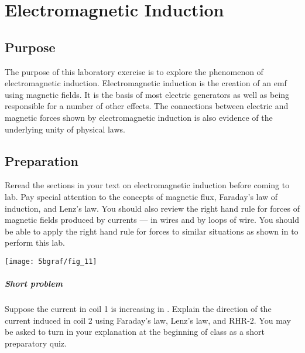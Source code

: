 \chapter{Electromagnetic Induction}

\begin{multicols}{2}
\section{Purpose}
The purpose of this laboratory exercise is to explore the phenomenon of electromagnetic induction.  Electromagnetic induction is the creation of an emf using magnetic fields.  It is the basis of most electric generators as well as being responsible for a number of other effects.  The connections between electric and magnetic forces shown by electromagnetic induction is also evidence of the underlying unity of physical laws.

\section{Preparation}
Reread the sections in your text on electromagnetic induction before coming to lab. Pay special attention to the concepts of magnetic flux, Faraday's law of induction, and Lenz's law.  You should also review the \textsf{right hand rule for forces} of magnetic fields produced by currents --- in wires and by loops of wire.  You should be able to apply the \textsf{right hand rule for forces} to similar situations as shown in  to perform this lab.



\begin{center}
	\texttt{[image: 5bgraf/fig\_11]}
	\label{f:fig11}
\end{center}

\paragraph{Short problem}
Suppose the current in coil 1 is increasing in .  Explain the direction of the current induced in coil 2 using Faraday's law, Lenz's law, and RHR-2.  You may be asked to turn in your explanation at the beginning of class as a short preparatory quiz.


\end{multicols}
